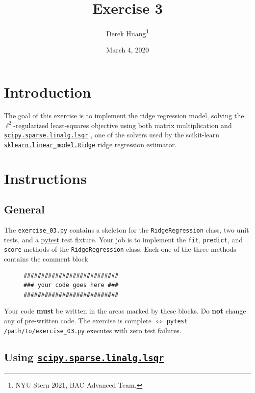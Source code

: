 \documentclass{article}
\title{Exercise 3}
\author{Derek Huang\thanks{NYU Stern 2021, BAC Advanced Team.}}
\date{March 4, 2020}
\numberwithin{equation}{section}
\newcommand{\pytest}{%
    \href{https://docs.pytest.org/en/stable/}{pytest}%
}
\newcommand{\lsqr}{%
    \href{%
        https://docs.scipy.org/doc/scipy/reference/generated/%
        scipy.sparse.linalg.lsqr.html%
    }{\texttt{scipy.sparse.linalg.lsqr}}%
}
\newcommand{\skridge}{%
    \href{%
        https://scikit-learn.org/stable/modules/generated/%
        sklearn.linear_model.Ridge.html%
    }{\texttt{sklearn.linear\_model.Ridge}}%
}
\begin{document}
\maketitle
\thispagestyle{fancy}

\section{Introduction}

The goal of this exercise is to implement the ridge regression model,
solving the $ \ell^2 $-regularized least-squares objective using both
matrix multiplication and \lsqr, one of the solvers used by the scikit-learn
\skridge{} ridge regression estimator.

\section{Instructions}

\subsection{General}

The \texttt{exercise\_03.py} contains a skeleton for the
\texttt{RidgeRegression} class, two unit tests, and a \pytest{} test fixture.
Your job is to implement the \texttt{fit}, \texttt{predict}, and
\texttt{score} methods of the \texttt{RidgeRegression} class. Each one of the
three methods contains the comment block

\begin{figure}[h!]
	\centering
	\begin{BVerbatim}
###########################
### your code goes here ###
###########################
	\end{BVerbatim}
	\vspace{-5 pt}
\end{figure}

Your code \textbf{must} be written in the areas marked by these blocks. Do
\textbf{not} change any of pre-written code. The exercise is complete
$ \Leftrightarrow $ \texttt{pytest /path/to/exercise\_03.py} executes with
zero test failures.

\subsection{Using \lsqr}
\end{document}
